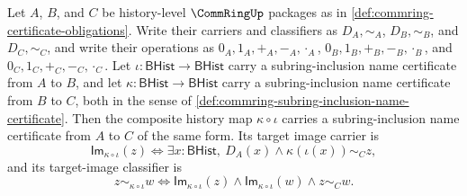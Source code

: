 \begin{theorem}
\label{thm:commring-subring-inclusion-transitivity}
Let $A$, $B$, and $C$ be history-level $\CommRingUp$ packages as in \autoref{def:commring-certificate-obligations}. Write their carriers and classifiers as $D_A,\sim_A$, $D_B,\sim_B$, and $D_C,\sim_C$, and write their operations as $0_A,1_A,+_A,-_A,\cdot_A$, $0_B,1_B,+_B,-_B,\cdot_B$, and $0_C,1_C,+_C,-_C,\cdot_C$. Let $\iota:\mathsf{BHist}\to\mathsf{BHist}$ carry a subring-inclusion name certificate from $A$ to $B$, and let $\kappa:\mathsf{BHist}\to\mathsf{BHist}$ carry a subring-inclusion name certificate from $B$ to $C$, both in the sense of \autoref{def:commring-subring-inclusion-name-certificate}. Then the composite history map $\kappa\circ\iota$ carries a subring-inclusion name certificate from $A$ to $C$ of the same form. Its target image carrier is
$$
\mathsf{Im}_{\kappa\circ\iota}(z)\Longleftrightarrow \exists x:\mathsf{BHist},\ D_A(x)\land \kappa(\iota(x))\sim_C z,
$$
and its target-image classifier is
$$
z\sim_{\kappa\circ\iota}w\Longleftrightarrow \mathsf{Im}_{\kappa\circ\iota}(z)\land\mathsf{Im}_{\kappa\circ\iota}(w)\land z\sim_C w.
$$
\end{theorem}
